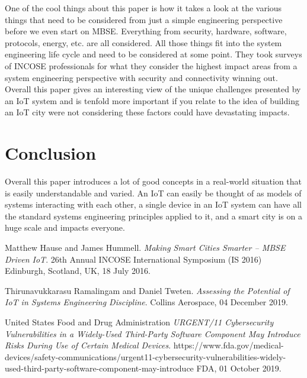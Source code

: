 \documentclass[11pt]{asme2ej}
\begin{document}
One of the cool things about this paper is how it takes a look at the various things that need to be considered from just a simple engineering perspective before we even start on MBSE. Everything from security, hardware, software, protocols, energy, etc. are all considered.
All those things fit into the system engineering life cycle and need to be considered at some point.
They took surveys of INCOSE professionals for what they consider the highest impact areas from a system engineering perspective with security and connectivity winning out.
Overall this paper gives an interesting view of the unique challenges presented by an IoT system and is tenfold more important if you relate to the idea of building an IoT city were not considering these factors could have devastating impacts.

\section{Conclusion}

Overall this paper introduces a lot of good concepts in a real-world situation that is easily understandable and varied. 
An IoT can easily be thought of as models of systems interacting with each other, a single device in an IoT system can have all the standard systems engineering principles applied to it, and a smart city is on a huge scale and impacts everyone.

\begin{thebibliography}{1}

    Matthew Hause and James Hummell. 
    \textit{Making Smart Cities Smarter – MBSE Driven IoT}. 
    26th Annual INCOSE International Symposium (IS 2016) Edinburgh, Scotland, UK, 18 July 2016.

    Thirunavukkarasu Ramalingam and Daniel Tweten. 
    \textit{Assessing the Potential of IoT in Systems Engineering Discipline}. 
    Collins Aerospace, 04 December 2019.

    United States Food and Drug Administration
    \textit{URGENT/11 Cybersecurity Vulnerabilities in a Widely-Used Third-Party Software Component May Introduce Risks During Use of Certain Medical Devices}. 
    https://www.fda.gov/medical-devices/safety-communications/urgent11-cybersecurity-vulnerabilities-widely-used-third-party-software-component-may-introduce
    FDA, 01 October 2019.
    
\end{thebibliography}
\end{document}
